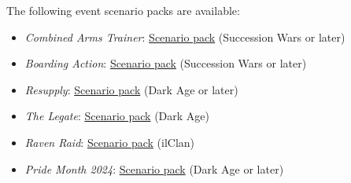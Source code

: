 The following event scenario packs are available:

\begin{itemize}

\item \emph{Combined Arms Trainer}: \href{https://raw.githubusercontent.com/Eudicods/outworlds-wastes/rules-pdf/combined-arms-trainer.pdf}{Scenario pack} (Succession Wars or later)

\item \emph{Boarding Action}: \href{https://raw.githubusercontent.com/Eudicods/outworlds-wastes/rules-pdf/boarding-action.pdf}{Scenario pack} (Succession Wars or later)

\item \emph{Resupply}: \href{https://raw.githubusercontent.com/Eudicods/outworlds-wastes/rules-pdf/resupply.pdf}{Scenario pack} (Dark Age or later)

\item \emph{The Legate}: \href{https://raw.githubusercontent.com/Eudicods/outworlds-wastes/rules-pdf/the-legate.pdf}{Scenario pack} (Dark Age)

\item \emph{Raven Raid}: \href{https://raw.githubusercontent.com/Eudicods/outworlds-wastes/rules-pdf/raven-raid.pdf}{Scenario pack} (ilClan)

\item \emph{Pride Month 2024}: \href{https://raw.githubusercontent.com/Eudicods/outworlds-wastes/rules-pdf/pride-2024.pdf}{Scenario pack} (Dark Age or later)

\end{itemize}
